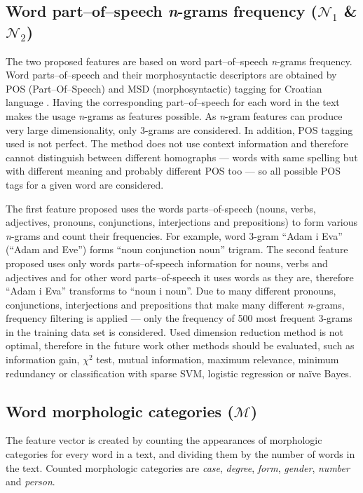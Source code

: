 \documentclass[11pt,english]{article}
\begin{document}
\begin{multicols}{2}
\subsection{Word part--of--speech \emph{n}-grams frequency ($\mathcal{N}_1$ \&
$\mathcal{N}_2$)}
\label{sec:ngrami-tipova}
The two proposed features are based on word part--of--speech \emph{n}-grams
frequency. Word parts--of--speech and their morphosyntactic descriptors are obtained by POS
(Part--Of--Speech) and MSD (morphosyntactic) tagging for Croatian language
\citep{snajder08automatic}. Having the corresponding part--of--speech for
each word in the text makes the usage \emph{n}-grams as features
possible. As \emph{n}-gram features can produce very large dimensionality, 
only 3-grams are considered. In addition, POS tagging used is not perfect. The
method does not use context information and therefore cannot distinguish between
different homographs --- words with same spelling but with different meaning and probably
different POS too --- so all possible POS tags for a given word are considered.

The first feature proposed uses the words parts--of-speech
(nouns, verbs, adjectives, pronouns, conjunctions, interjections and
prepositions) to form various \emph{n}-grams and count their frequencies. For
example, word 3-gram ``Adam i Eva'' (``Adam and Eve'') forms ``noun
conjunction noun'' trigram. The second feature proposed uses only words
parts--of-speech information for nouns, verbs and adjectives and for other word
parts--of-speech it uses words as they are, therefore ``Adam i Eva'' transforms
to ``noun i noun''. Due to many different pronouns, conjunctions, interjections
and prepositions that make many different \emph{n}-grams, frequency filtering
is applied --- only the frequency of 500 most frequent 3-grams in the
training data set is considered. Used dimension reduction method is not optimal,
therefore in the future work other methods should be evaluated, such as information
gain, $\chi^2$ test, mutual information, maximum relevance, minimum redundancy
or classification with sparse SVM, logistic regression or na\"ive Bayes.

\subsection{Word morphologic categories ($\mathcal{M}$)}
\label{sec:morphosyntactic}
The feature vector is created by counting the appearances of morphologic
categories for every word in a text, and dividing them by the number of words in the text.
Counted morphologic categories are \emph{case}, \emph{degree}, \emph{form},
\emph{gender}, \emph{number} and \emph{person}.

\end{multicols}
\end{document}
